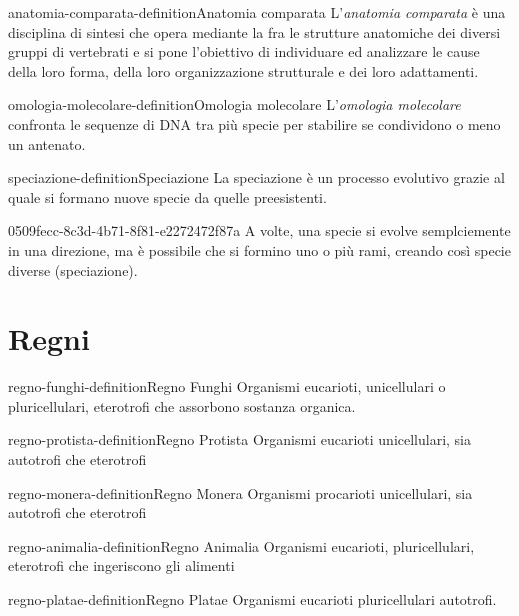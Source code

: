 \documentclass[preview]{standalone}
\begin{document}
\begin{snippetdefinition}{anatomia-comparata-definition}{Anatomia comparata}
    L'\textit{anatomia comparata} è una disciplina di sintesi che 
    opera mediante la  fra le strutture anatomiche
    dei diversi gruppi di vertebrati e si pone l'obiettivo di individuare ed analizzare
    le cause della loro forma, della loro organizzazione strutturale e dei loro adattamenti.
\end{snippetdefinition}

\begin{snippetdefinition}{omologia-molecolare-definition}{Omologia molecolare}
    L'\textit{omologia molecolare} confronta le sequenze di DNA
    tra più specie per stabilire se condividono o meno un antenato.
\end{snippetdefinition}


\begin{snippetdefinition}{speciazione-definition}{Speciazione}
    La speciazione è un processo evolutivo grazie al quale si formano nuove specie da quelle preesistenti. 
\end{snippetdefinition}

\begin{snippet}{0509fecc-8c3d-4b71-8f81-e2272472f87a}
    A volte, una specie si evolve semplciemente in una direzione, ma è possibile che si formino
    uno o più rami, creando così specie diverse (speciazione).
\end{snippet}


\section{Regni}

\begin{snippetdefinition}{regno-funghi-definition}{Regno Funghi}
    Organismi eucarioti, unicellulari o pluricellulari, eterotrofi
    che assorbono sostanza organica.
\end{snippetdefinition}

\begin{snippetdefinition}{regno-protista-definition}{Regno Protista}
    Organismi eucarioti unicellulari, sia autotrofi
    che eterotrofi
\end{snippetdefinition}

\begin{snippetdefinition}{regno-monera-definition}{Regno Monera}
    Organismi procarioti
    unicellulari, sia autotrofi che eterotrofi
\end{snippetdefinition}

\begin{snippetdefinition}{regno-animalia-definition}{Regno Animalia}
    Organismi eucarioti, pluricellulari, eterotrofi
    che ingeriscono gli alimenti
\end{snippetdefinition}

\begin{snippetdefinition}{regno-platae-definition}{Regno Platae}
    Organismi eucarioti pluricellulari autotrofi.
\end{snippetdefinition}
\end{document}
